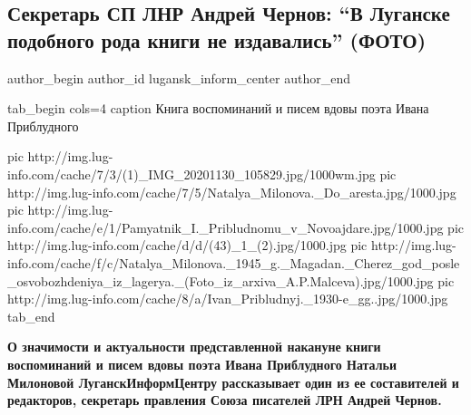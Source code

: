  
 
 
 
 
 
\subsection{Секретарь СП ЛНР Андрей Чернов: \enquote{В Луганске подобного рода книги не издавались} (ФОТО)}
\label{sec:01_12_2020.news.lnr.lug_info.lugansk_inform_center.1.kniga_pribludnyy}
\ifcmt
	author_begin
   author_id lugansk_inform_center
	author_end
\fi


\ifcmt
tab_begin cols=4
	caption Книга воспоминаний и писем вдовы поэта Ивана Приблудного

pic http://img.lug-info.com/cache/7/3/(1)_IMG_20201130_105829.jpg/1000wm.jpg
pic http://img.lug-info.com/cache/7/5/Natalya_Milonova._Do_aresta.jpg/1000.jpg
pic http://img.lug-info.com/cache/e/1/Pamyatnik_I._Pribludnomu_v_Novoajdare.jpg/1000.jpg
pic http://img.lug-info.com/cache/d/d/(43)_1_(2).jpg/1000.jpg
pic http://img.lug-info.com/cache/f/c/Natalya_Milonova._1945_g._Magadan._Cherez_god_posle_osvobozhdeniya_iz_lagerya._(Foto_iz_arxiva_A.P.Malceva).jpg/1000.jpg
pic http://img.lug-info.com/cache/8/a/Ivan_Pribludnyj._1930-e_gg..jpg/1000.jpg
tab_end
\fi

\begin{leftbar}
	\bfseries
О значимости и актуальности представленной накануне книги воспоминаний и писем
вдовы поэта Ивана Приблудного Натальи Милоновой ЛуганскИнформЦентру
рассказывает один из ее составителей и редакторов, секретарь правления
Союза писателей ЛРН Андрей Чернов.
\end{leftbar}

